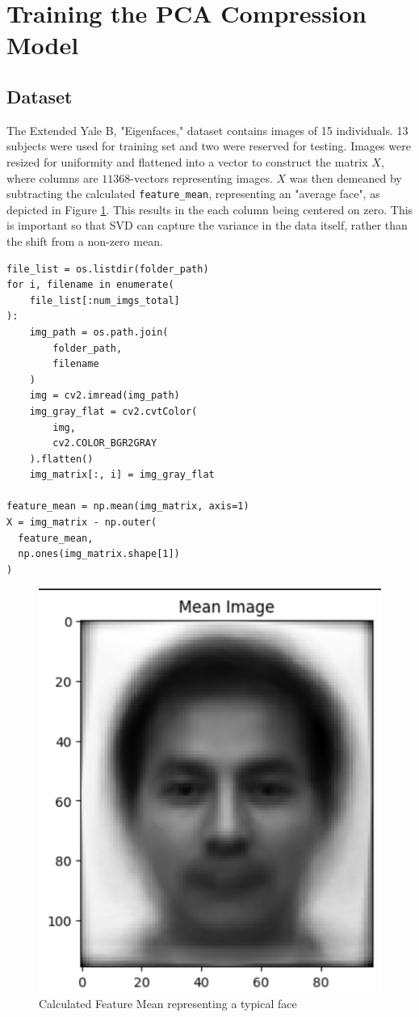\documentclass[conference]{IEEEtran}
\begin{document}
\section{Training the PCA Compression Model}
\subsection{Dataset}
The Extended Yale B, "Eigenfaces," dataset contains images of 15 individuals. 13 subjects were used for training set and two were reserved for testing. Images were resized for uniformity and flattened into a vector to construct the matrix $X$, where columns are $11368$-vectors representing images. $X$ was then demeaned by subtracting the calculated \texttt{feature\_mean}, representing an "average face", as depicted in Figure \ref{fig:feature_mean}. This results in the each column being centered on zero. This is important so that SVD can capture the variance in the data itself, rather than the shift from a non-zero mean.

\begin{verbatim}
file_list = os.listdir(folder_path)
for i, filename in enumerate(
    file_list[:num_imgs_total]
):
    img_path = os.path.join(
        folder_path,
        filename
    )
    img = cv2.imread(img_path)
    img_gray_flat = cv2.cvtColor(
        img,
        cv2.COLOR_BGR2GRAY
    ).flatten()
    img_matrix[:, i] = img_gray_flat

feature_mean = np.mean(img_matrix, axis=1)
X = img_matrix - np.outer(
  feature_mean,
  np.ones(img_matrix.shape[1])
)
\end{verbatim}

\begin{figure}[htbp]
  \centerline{\includegraphics[scale=0.4]{figures/feature_mean.png}}
  \caption{Calculated Feature Mean representing a typical face}
  \label{fig:feature_mean}
\end{figure}  
\end{document}
